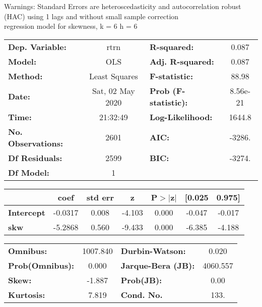 Warnings: \newline
 [1] Standard Errors are heteroscedasticity and autocorrelation robust (HAC) using 1 lags and without small sample correction\\ 

regression model for skewness, k = 6 h = 6\begin{center}
\begin{tabular}{lclc}
\toprule
\textbf{Dep. Variable:}    &       rtrn       & \textbf{  R-squared:         } &     0.087   \\
\textbf{Model:}            &       OLS        & \textbf{  Adj. R-squared:    } &     0.087   \\
\textbf{Method:}           &  Least Squares   & \textbf{  F-statistic:       } &     88.98   \\
\textbf{Date:}             & Sat, 02 May 2020 & \textbf{  Prob (F-statistic):} &  8.56e-21   \\
\textbf{Time:}             &     21:32:49     & \textbf{  Log-Likelihood:    } &    1644.8   \\
\textbf{No. Observations:} &        2601      & \textbf{  AIC:               } &    -3286.   \\
\textbf{Df Residuals:}     &        2599      & \textbf{  BIC:               } &    -3274.   \\
\textbf{Df Model:}         &           1      & \textbf{                     } &             \\
\bottomrule
\end{tabular}
\begin{tabular}{lcccccc}
                   & \textbf{coef} & \textbf{std err} & \textbf{z} & \textbf{P$> |$z$|$} & \textbf{[0.025} & \textbf{0.975]}  \\
\midrule
\textbf{Intercept} &      -0.0317  &        0.008     &    -4.103  &         0.000        &       -0.047    &       -0.017     \\
\textbf{skw}       &      -5.2868  &        0.560     &    -9.433  &         0.000        &       -6.385    &       -4.188     \\
\bottomrule
\end{tabular}
\begin{tabular}{lclc}
\textbf{Omnibus:}       & 1007.840 & \textbf{  Durbin-Watson:     } &    0.020  \\
\textbf{Prob(Omnibus):} &   0.000  & \textbf{  Jarque-Bera (JB):  } & 4060.557  \\
\textbf{Skew:}          &  -1.887  & \textbf{  Prob(JB):          } &     0.00  \\
\textbf{Kurtosis:}      &   7.819  & \textbf{  Cond. No.          } &     133.  \\
\bottomrule
\end{tabular}
\end{center}


